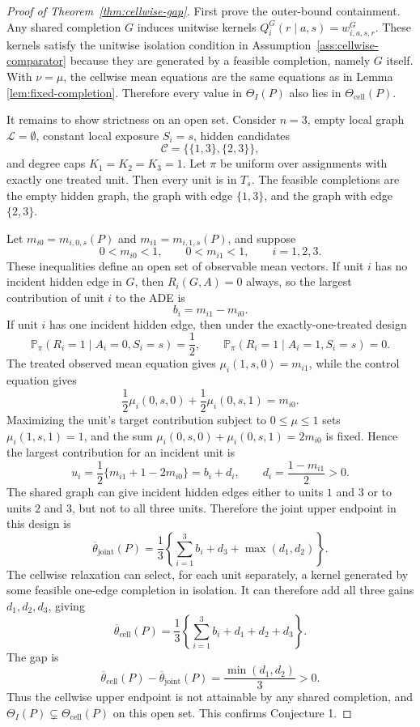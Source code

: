 \documentclass[11pt]{article}
\renewcommand{\Pr}{\mathbb{P}}
\theoremstyle{definition}
\theoremstyle{plain}
\theoremstyle{remark}
\begin{document}
\begin{proof}[Proof of Theorem~\ref{thm:cellwise-gap}]
First prove the outer-bound containment.  Any shared completion \(G\) induces
unitwise kernels \(Q_i^G(r\mid a,s)=w^G_{i,a,s,r}\).  These kernels satisfy the
unitwise isolation condition in Assumption~\ref{ass:cellwise-comparator}
because they are generated by a feasible completion, namely \(G\) itself.  With
\(\nu=\mu\), the cellwise mean equations are the same equations as in Lemma
\ref{lem:fixed-completion}.  Therefore every value in \(\Theta_I(P)\) also lies
in \(\Theta_{\mathrm{cell}}(P)\).

It remains to show strictness on an open set.  Consider \(n=3\), empty local
graph \(\mathcal L=\emptyset\), constant local exposure \(S_i=s\), hidden
candidates
\[
\mathcal C=\{\{1,3\},\{2,3\}\},
\]
and degree caps \(K_1=K_2=K_3=1\).  Let \(\pi\) be uniform over assignments with
exactly one treated unit.  Then every unit is in \(T_s\).  The feasible
completions are the empty hidden graph, the graph with edge \(\{1,3\}\), and
the graph with edge \(\{2,3\}\).

Let \(m_{i0}=m_{i,0,s}(P)\) and \(m_{i1}=m_{i,1,s}(P)\), and suppose
\[
0<m_{i0}<1,\qquad 0<m_{i1}<1,\qquad i=1,2,3.
\]
These inequalities define an open set of observable mean vectors.  If unit
\(i\) has no incident hidden edge in \(G\), then \(R_i(G,A)=0\) always, so the
largest contribution of unit \(i\) to the ADE is
\[
b_i=m_{i1}-m_{i0}.
\]
If unit \(i\) has one incident hidden edge, then under the exactly-one-treated
design
\[
\Pr_\pi(R_i=1\mid A_i=0,S_i=s)=\frac12,\qquad
\Pr_\pi(R_i=1\mid A_i=1,S_i=s)=0.
\]
The treated observed mean equation gives \(\mu_i(1,s,0)=m_{i1}\), while the
control equation gives
\[
\frac12\mu_i(0,s,0)+\frac12\mu_i(0,s,1)=m_{i0}.
\]
Maximizing the unit's target contribution subject to \(0\le\mu\le1\) sets
\(\mu_i(1,s,1)=1\), and the sum
\(\mu_i(0,s,0)+\mu_i(0,s,1)=2m_{i0}\) is fixed.  Hence the largest contribution
for an incident unit is
\[
u_i=\frac12\{m_{i1}+1-2m_{i0}\}
=b_i+d_i,
\qquad
d_i=\frac{1-m_{i1}}{2}>0.
\]
The shared graph can give incident hidden edges either to units \(1\) and \(3\)
or to units \(2\) and \(3\), but not to all three units.  Therefore the joint
upper endpoint in this design is
\[
\overline\theta_{\mathrm{joint}}(P)
=\frac13\left\{\sum_{i=1}^3 b_i+d_3+\max(d_1,d_2)\right\}.
\]
The cellwise relaxation can select, for each unit separately, a kernel generated
by some feasible one-edge completion in isolation.  It can therefore add all
three gains \(d_1,d_2,d_3\), giving
\[
\overline\theta_{\mathrm{cell}}(P)
=\frac13\left\{\sum_{i=1}^3 b_i+d_1+d_2+d_3\right\}.
\]
The gap is
\[
\overline\theta_{\mathrm{cell}}(P)
-\overline\theta_{\mathrm{joint}}(P)
=\frac{\min(d_1,d_2)}{3}>0.
\]
Thus the cellwise upper endpoint is not attainable by any shared completion, and
\(\Theta_I(P)\subsetneq\Theta_{\mathrm{cell}}(P)\) on this open set.  This
confirms Conjecture 1.


\end{proof}
\end{document}
